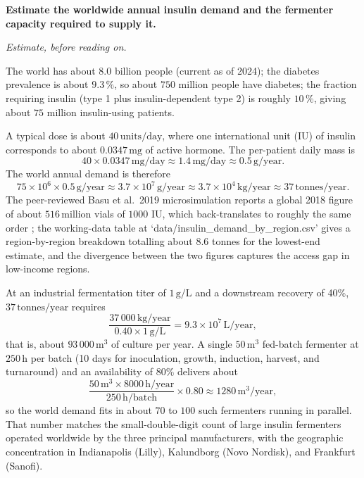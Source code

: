 \begin{estimation}
\textbf{Estimate the worldwide annual insulin demand and the
fermenter capacity required to supply it.}

\smallskip
\textit{Estimate, before reading on.}

\smallskip
The world has about $8.0$ billion people (current as of 2024); the
diabetes prevalence is about $9.3\,\%$, so about $750$ million people
have diabetes; the fraction requiring insulin (type 1 plus
insulin-dependent type 2) is roughly $10\,\%$, giving about
$75$ million insulin-using patients.

A typical dose is about $40\,\text{units}/\text{day}$, where one
international unit (IU) of insulin corresponds to about
$0.0347\,\text{mg}$ of active hormone. The per-patient daily mass is
\[
40 \times 0.0347 \,\text{mg}/\text{day}
\approx 1.4\,\text{mg}/\text{day}
\approx 0.5\,\text{g}/\text{year}.
\]
The world annual demand is therefore
\[
75 \times 10^6 \times 0.5\,\text{g}/\text{year}
\approx 3.7 \times 10^7\,\text{g}/\text{year}
\approx 3.7 \times 10^4\,\text{kg}/\text{year}
\approx 37\,\text{tonnes}/\text{year}.
\]
The peer-reviewed Basu et al.\ 2019 microsimulation reports a global
2018 figure of about $516\,\text{million}$ vials of $1000$ IU, which
back-translates to roughly the same order
\cite{paper:v6c10-basu-insulin-access-2019}; the working-data table at
`data/insulin_demand_by_region.csv' gives a region-by-region breakdown
totalling about $8.6$ tonnes for the lowest-end estimate, and the
divergence between the two figures captures the access gap in
low-income regions.

At an industrial fermentation titer of $1\,\text{g}/\text{L}$ and a
downstream recovery of 40\%, $37\,\text{tonnes}/\text{year}$ requires
\[
\frac{37\,000\,\text{kg}/\text{year}}{0.40 \times 1\,\text{g}/\text{L}}
= 9.3 \times 10^7\,\text{L}/\text{year},
\]
that is, about $93\,000\,\text{m}^3$ of culture per year. A
single $50\,\text{m}^3$ fed-batch fermenter at $250\,\text{h}$ per
batch (10 days for inoculation, growth, induction, harvest, and
turnaround) and an availability of 80\% delivers about
\[
\frac{50\,\text{m}^3 \times 8000\,\text{h}/\text{year}}{250\,\text{h}/\text{batch}}
\times 0.80 \approx 1280\,\text{m}^3/\text{year},
\]
so the world demand fits in about $70$ to $100$ such fermenters
running in parallel. That number matches the small-double-digit
count of large insulin fermenters operated worldwide by the three
principal manufacturers, with the geographic concentration in
Indianapolis (Lilly), Kalundborg (Novo Nordisk), and Frankfurt
(Sanofi).
\end{estimation}

